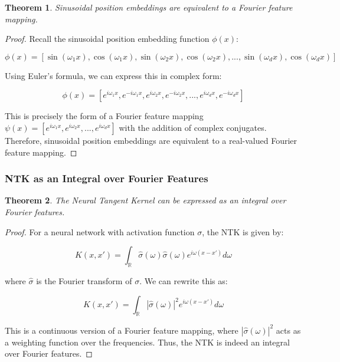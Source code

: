 \documentclass{article}
\newtheorem{theorem}{Theorem}
\begin{document}
\begin{theorem}
Sinusoidal position embeddings are equivalent to a Fourier feature mapping.
\end{theorem}

\begin{proof}
Recall the sinusoidal position embedding function $\phi(x)$:

\begin{equation}
    \phi(x) = [\sin(\omega_1 x), \cos(\omega_1 x), \sin(\omega_2 x), \cos(\omega_2 x), ..., \sin(\omega_d x), \cos(\omega_d x)]
\end{equation}

Using Euler's formula, we can express this in complex form:

\begin{equation}
    \phi(x) = [e^{i\omega_1 x}, e^{-i\omega_1 x}, e^{i\omega_2 x}, e^{-i\omega_2 x}, ..., e^{i\omega_d x}, e^{-i\omega_d x}]
\end{equation}

This is precisely the form of a Fourier feature mapping $\psi(x) = [e^{i\omega_1 x}, e^{i\omega_2 x}, ..., e^{i\omega_d x}]$ with the addition of complex conjugates. Therefore, sinusoidal position embeddings are equivalent to a real-valued Fourier feature mapping.
\end{proof}

\subsubsection{NTK as an Integral over Fourier Features}

\begin{theorem}
The Neural Tangent Kernel can be expressed as an integral over Fourier features.
\end{theorem}

\begin{proof}
For a neural network with activation function $\sigma$, the NTK is given by:

\begin{equation}
    K(x, x') = \int_{\mathbb{R}} \hat{\sigma}(\omega) \hat{\sigma}(\omega) e^{i\omega(x-x')} d\omega
\end{equation}

where $\hat{\sigma}$ is the Fourier transform of $\sigma$. We can rewrite this as:

\begin{equation}
    K(x, x') = \int_{\mathbb{R}} |\hat{\sigma}(\omega)|^2 e^{i\omega(x-x')} d\omega
\end{equation}

This is a continuous version of a Fourier feature mapping, where $|\hat{\sigma}(\omega)|^2$ acts as a weighting function over the frequencies. Thus, the NTK is indeed an integral over Fourier features.
\end{proof}
\end{document}
